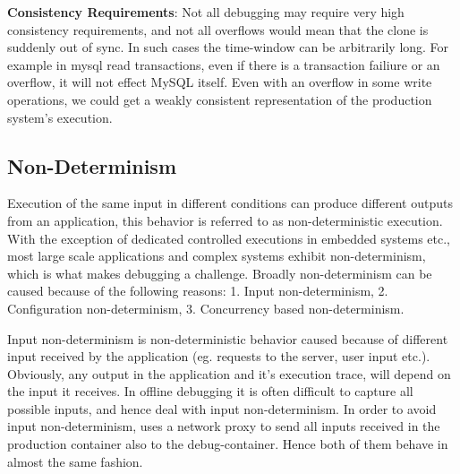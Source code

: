 


\iffalse

\textbf{Consistency Requirements}: Not all debugging may require very high consistency requirements, and not all overflows would mean that the clone is suddenly out of sync.
In such cases the time-window can be arbitrarily long. 
For example in mysql read transactions, even if there is a transaction failiure or an overflow, it will not effect MySQL itself.
Even with an overflow in some write operations, we could get a weakly consistent representation of the production system's execution.


\subsection{Non-Determinism}
\label{sec:nonDeterminism}

Execution of the same input in different conditions can produce different outputs from an application, this behavior is referred to as non-deterministic execution.
With the exception of dedicated controlled executions in embedded systems etc., most large scale applications and complex systems exhibit non-determinism, which is what makes debugging a challenge.
Broadly non-determinism can be caused because of the following reasons: 1. Input non-determinism, 2. Configuration non-determinism, 3. Concurrency based non-determinism.

Input non-determinism is non-deterministic behavior caused because of different input received by the application (eg. requests to the server, user input etc.). 
Obviously, any output in the application and it's execution trace, will depend on the input it receives. 
In offline debugging it is often difficult to capture all possible inputs, and hence deal with input non-determinism.
In order to avoid input non-determinism, \parikshan uses a network proxy to send all inputs received in the production container also to the debug-container. 
Hence both of them behave in almost the same fashion.

